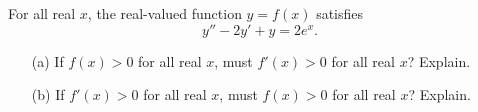For all real $x$, the real-valued function $y=f(x)$ satisfies
\[
y''-2y'+y=2e^x.
\]
\begin{enumerate}
\item[(a)] If $f(x)>0$ for all real $x$, must $f'(x) > 0$ for all real
$x$? Explain.
\item[(b)] If $f'(x)>0$ for all real $x$, must $f(x) > 0$ for all real
$x$? Explain.
\end{enumerate}

